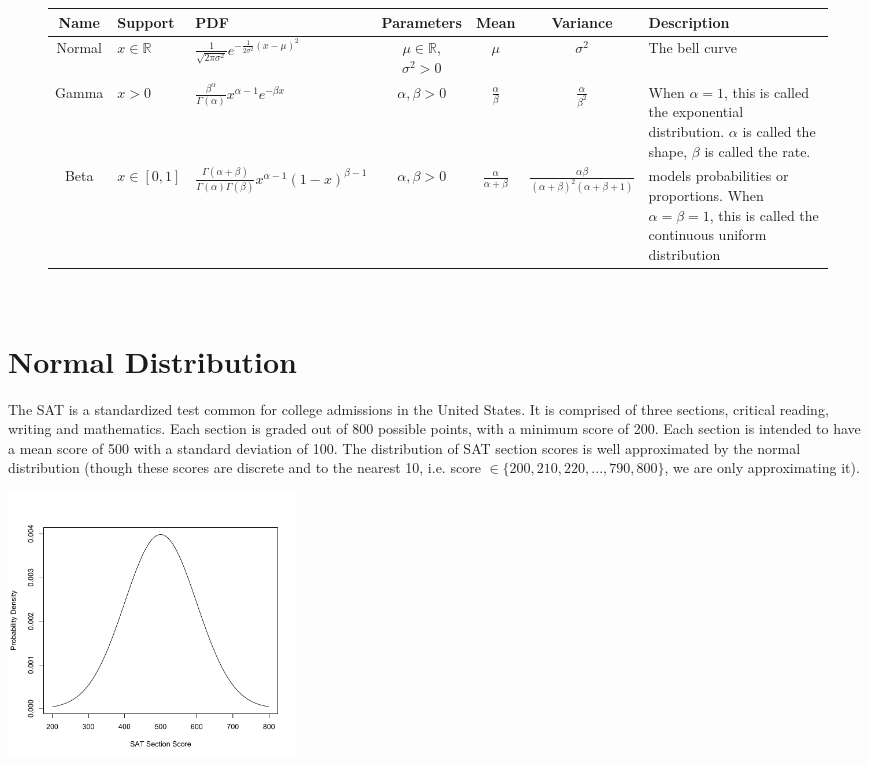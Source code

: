 \begin{figure}[h!]
\begin{center}
\begin{tabular}{|c|l|l|c|c|c|l|}
	\hline
Name & Support &  PDF & Parameters & Mean & Variance & Description\\
\hline \hline
Normal  & $x \in \mathbb{R}$ &$\frac{1}{\sqrt{2\pi \sigma^2}} e^{-\frac{1}{2\sigma^2}(x-\mu)^2}$ & $\mu \in \mathbb{R}$, $\sigma^2 > 0$ & $\mu$ & $\sigma^2$ & The bell curve\\ \hline
Gamma  & $x>0$ &$\frac{\beta^\alpha}{\Gamma(\alpha)} x^{\alpha -1} e^{-\beta x}$ & $\alpha,\beta>0$ & $\frac{\alpha}{\beta}$ & $\frac{\alpha}{\beta^2}$ & When $\alpha=1$, this is called the exponential distribution. $\alpha$ is called the shape, $\beta$ is called the rate.\\ \hline
Beta  & $x \in [0,1]$ & $\frac{\Gamma(\alpha+\beta)}{\Gamma(\alpha)\Gamma(\beta)} x^{\alpha-1} (1-x)^{\beta-1}$ & $\alpha,\beta>0$ & $\frac{\alpha}{\alpha + \beta}$ & $\frac{\alpha \beta}{(\alpha + \beta)^2(\alpha + \beta +1)}$ & models probabilities or proportions. When $\alpha = \beta =1$, this is called the continuous uniform distribution\\ 
\hline
\end{tabular}\\
\end{center}
\end{figure}

\section*{Normal Distribution}

The SAT is a standardized test common for college admissions in the United States. It is comprised of three sections, critical reading, writing and mathematics. Each section is graded out of 800 possible points, with a minimum score of 200. Each section is intended to have a mean score of 500 with a standard deviation of 100.  The distribution of SAT section scores is well approximated by the normal distribution (though these scores are discrete and to the nearest 10, i.e. score $\in \{200,210,220,...,790,800\}$, we are only approximating it). 

\begin{center}
\includegraphics[width=3in]{normaldist.pdf}
\end{center}

